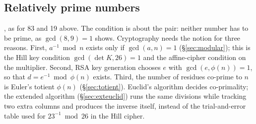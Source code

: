 \subsection{Relatively prime numbers}
, as for 83 and 19 above. The condition is about the pair: neither number has to be prime, as $\gcd(8, 9) = 1$ shows. Cryptography needs the notion for three reasons. First, $a^{-1} \bmod n$ exists only if $\gcd(a, n) = 1$ (\S\ref{sec:modular}); this is the Hill key condition $\gcd(\det K, 26) = 1$ and the affine-cipher condition on the multiplier. Second, RSA key generation chooses $e$ with $\gcd(e, \phi(n)) = 1$, so that $d = e^{-1} \bmod \phi(n)$ exists. Third, the number of residues co-prime to $n$ is Euler's totient $\phi(n)$ (\S\ref{sec:totient}). Euclid's algorithm decides co-primality; the extended algorithm (\S\ref{sec:exteuclid}) runs the same divisions while tracking two extra columns and produces the inverse itself, instead of the trial-and-error table used for $23^{-1} \bmod 26$ in the Hill cipher.

